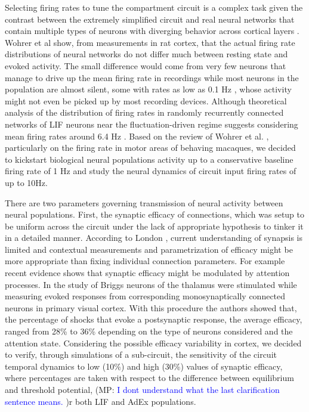 \documentclass[10pt]{article}
\newcommand{\notenewMP}[3]{(MP: \textcolor{blue}{#1})}
\begin{document}
Selecting firing rates to tune the compartment circuit is a complex task given the contrast between the extremely simplified circuit and real neural networks that contain multiple types of neurons with diverging behavior across cortical layers \cite{Wohrer_2013}.
Wohrer et al \cite{Wohrer_2013} show, from measurements in rat cortex, that the actual firing rate distributions of neural networks do not differ much between resting state and evoked activity.
The small difference would come from very few neurons that manage to drive up the mean firing rate in recordings while most neurons in the population are almost silent, some with rates as low as 0.1 Hz \cite{Kerr_2005}, whose activity might not even be picked up by most recording devices.
Although theoretical analysis of the distribution of firing rates in randomly recurrently connected networks of LIF neurons near the fluctuation-driven regime suggests considering mean firing rates around 6.4 Hz \cite{Roxin_2011}.
Based on the review of Wohrer et al. \cite{Wohrer_2013}, particularly on the firing rate in motor areas of behaving macaques, we decided to kickstart biological neural populations activity up to a conservative baseline firing rate of 1 Hz and study the neural dynamics of circuit input firing rates of up to 10Hz.

There are two parameters governing transmission of neural activity between neural populations.
First, the synaptic efficacy of connections, which was setup to be uniform across the circuit under the lack of appropriate hypothesis to tinker it in a detailed manner. According to London \cite{London_2002}, current understanding of synapsis is limited and contextual measurements and parametrization of efficacy might be more appropriate than fixing individual connection parameters.
For example recent evidence \cite{Briggs_2013} shows that synaptic efficacy might be modulated by attention processes.
In the study of Briggs \cite{Briggs_2013} neurons of the thalamus were stimulated while measuring evoked responses from corresponding monosynaptically connected neurons in primary visual cortex.
With this procedure the authors showed that, the percentage of shocks that evoke a postsynaptic response, the average efficacy, ranged from 28\% to 36\% depending on the type of neurons considered and the attention state.
Considering the possible efficacy variability in cortex, we decided to verify, through simulations of a sub-circuit, the sensitivity of the circuit temporal dynamics to low (10\%) and high (30\%) values of synaptic efficacy, where percentages are taken with respect to the difference between equilibrium and threshold potential, \notenewMP{I dont understand what the last clarification sentence means. }  for both LIF and AdEx populations.
\end{document}

